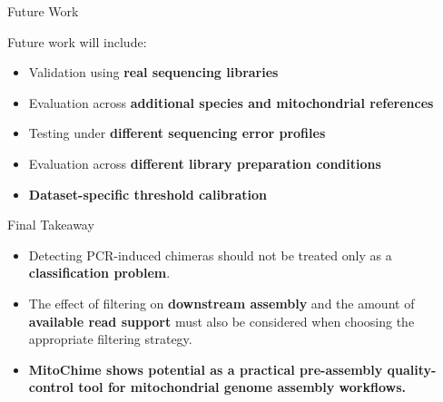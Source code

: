 \documentclass[aspectratio=169,11pt]{beamer}
\begin{document}

\begin{frame}{Future Work}

\vspace{0.45cm}

Future work will include:

\vspace{0.25cm}

\begin{itemize}

    \setlength{\itemsep}{0.32cm}

    \item
    Validation using \textbf{real sequencing libraries}

    \item
    Evaluation across \textbf{additional species and mitochondrial references}

    \item
    Testing under \textbf{different sequencing error profiles}

    \item
    Evaluation across \textbf{different library preparation conditions}

    \item
    \textbf{Dataset-specific threshold calibration}

\end{itemize}

\end{frame}




\begin{frame}{Final Takeaway}

\vspace{0.45cm}

\begin{itemize}

    \setlength{\itemsep}{0.45cm}

    \item
    Detecting PCR-induced chimeras should not be treated only as a
    \textbf{classification problem}.

    \item
    The effect of filtering on
    \textbf{downstream assembly} and the amount of
    \textbf{available read support}
    must also be considered when choosing the appropriate
    filtering strategy.

    \item
    \textbf{MitoChime shows potential as a practical
    pre-assembly quality-control tool for mitochondrial
    genome assembly workflows.}

\end{itemize}

\end{frame}
\end{document}
